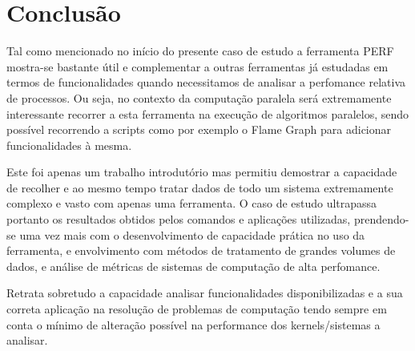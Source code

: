 \documentclass[conference,compsoc]{IEEEtran}
\begin{document}
    \section{Conclusão}


    Tal como mencionado no início do presente caso de estudo a ferramenta PERF mostra-se bastante útil e complementar a outras ferramentas já estudadas em termos de funcionalidades quando necessitamos de analisar a perfomance relativa de processos. Ou seja, no contexto da computação paralela será extremamente interessante recorrer a esta ferramenta na execução de algoritmos paralelos, sendo possível recorrendo a scripts como por exemplo o Flame Graph para adicionar funcionalidades à mesma. \par 
    Este foi apenas um trabalho introdutório mas permitiu demostrar a capacidade de recolher e ao mesmo tempo tratar dados de todo um sistema extremamente complexo e vasto com apenas uma ferramenta. O caso de estudo ultrapassa portanto os resultados obtidos pelos comandos e aplicações utilizadas, prendendo-se uma vez mais com o desenvolvimento de capacidade  prática no uso da ferramenta, e envolvimento com métodos de tratamento de grandes volumes de dados, e análise de métricas de sistemas de computação de alta perfomance.\par Retrata sobretudo a capacidade analisar funcionalidades disponibilizadas e a sua correta aplicação na resolução de problemas de computação tendo sempre em conta o mínimo de alteração possível na performance dos kernels/sistemas a analisar.











\end{document}
